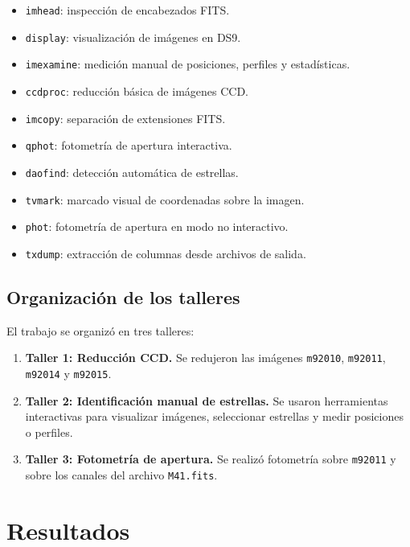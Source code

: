 \documentclass[12pt,letterpaper]{article}
\begin{document}
\begin{itemize}
    \item \texttt{imhead}: inspección de encabezados FITS.
    \item \texttt{display}: visualización de imágenes en DS9.
    \item \texttt{imexamine}: medición manual de posiciones, perfiles y estadísticas.
    \item \texttt{ccdproc}: reducción básica de imágenes CCD.
    \item \texttt{imcopy}: separación de extensiones FITS.
    \item \texttt{qphot}: fotometría de apertura interactiva.
    \item \texttt{daofind}: detección automática de estrellas.
    \item \texttt{tvmark}: marcado visual de coordenadas sobre la imagen.
    \item \texttt{phot}: fotometría de apertura en modo no interactivo.
    \item \texttt{txdump}: extracción de columnas desde archivos de salida.
\end{itemize}

\subsection{Organización de los talleres}

El trabajo se organizó en tres talleres:

\begin{enumerate}
    \item \textbf{Taller 1: Reducción CCD.} Se redujeron las imágenes \texttt{m92010}, \texttt{m92011}, \texttt{m92014} y \texttt{m92015}.
    
    \item \textbf{Taller 2: Identificación manual de estrellas.} Se usaron herramientas interactivas para visualizar imágenes, seleccionar estrellas y medir posiciones o perfiles.
    
    \item \textbf{Taller 3: Fotometría de apertura.} Se realizó fotometría sobre \texttt{m92011} y sobre los canales del archivo \texttt{M41.fits}.
\end{enumerate}

\section{Resultados}
\end{document}
